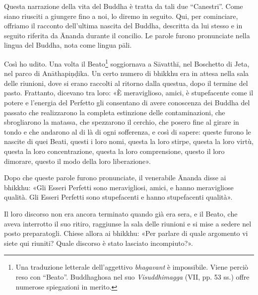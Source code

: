  Questa narrazione della vita del Buddha è tratta da
tali due “Canestri”. Come siano riusciti a giungere fino a noi, lo diremo in
seguito. Qui, per cominciare, offriamo il racconto dell’ultima nascita del
Buddha, descritta da lui stesso e in seguito riferita da Ānanda durante il
concilio. Le parole furono pronunciate nella lingua del Buddha, nota come lingua
pāli.

Così ho udito. Una volta il Beato\footnote{Una traduzione
  letterale dell’aggettivo \emph{bhagavant} è impossibile. Viene perciò reso con
  “Beato”. Buddhaghosa nel suo \emph{Visuddhimagga} (VII, pp. 53 ss.) offre
  numerose spiegazioni in merito.} soggiornava a Sāvatthī, nel Boschetto di
Jeta, nel parco di Anāthapiṇḍika. Un certo numero di bhikkhu
era in attesa nella sala delle riunioni, dove si erano raccolti al ritorno dalla
questua, dopo il termine del pasto. Frattanto, dicevano tra loro: «È
meraviglioso, amici, è stupefacente come il potere e l’energia del Perfetto gli
consentano di avere conoscenza dei Buddha del passato che realizzarono la
completa estinzione delle contaminazioni, che sbrogliarono la matassa, che
spezzarono il cerchio, che posero fine al girare in tondo e che andarono al di
là di ogni sofferenza, e così di sapere: queste furono le nascite di quei Beati,
questi i loro nomi, questa la loro stirpe, questa la loro virtù, questa la loro
concentrazione, questa la loro comprensione, questo il loro dimorare, questo il
modo della loro liberazione».

Dopo che queste parole furono pronunciate, il venerabile Ānanda disse ai
bhikkhu: «Gli Esseri Perfetti sono meravigliosi, amici, e hanno meravigliose
qualità. Gli Esseri Perfetti sono stupefacenti e hanno stupefacenti qualità».

Il loro discorso non era ancora terminato quando già era sera, e il Beato, che
aveva interrotto il suo ritiro, raggiunse la sala delle riunioni e si mise a
sedere nel posto preparatogli. Chiese allora ai bhikkhu: «Per parlare di quale
argomento vi siete qui riuniti? Quale discorso è stato lasciato incompiuto?».

